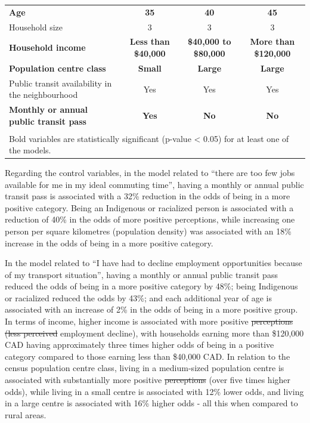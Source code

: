 \documentclass[preprint, 3p,
authoryear]{elsarticle} %
\providecommand{\DIFaddtex}[1]{{\protect\color{blue}\uwave{#1}}} %
\providecommand{\DIFdeltex}[1]{{\protect\color{red}\sout{#1}}}                      %
\providecommand{\DIFaddbegin}{} %
\providecommand{\DIFaddend}{} %
\providecommand{\DIFdelbegin}{} %
\providecommand{\DIFdelend}{} %
\providecommand{\DIFaddendFL}{} %
\providecommand{\DIFadd}[1]{\texorpdfstring{\DIFaddtex{#1}}{#1}} %
\providecommand{\DIFdel}[1]{\texorpdfstring{\DIFdeltex{#1}}{}} %
\newcommand{\DIFscaledelfig}{0.5}
\newlength{\DIFdelgraphicswidth} %
\newlength{\DIFdelgraphicsheight} %
\newcommand{\DIFaddincludegraphics}[2][]{{\color{blue}\fbox{\DIFOincludegraphics[#1]{#2}}}} %
\newcommand{\DIFdelincludegraphics}[2][]{%
\sbox{\DIFdelgraphicsbox}{\DIFOincludegraphics[#1]{#2}}%
\settoboxwidth{\DIFdelgraphicswidth}{\DIFdelgraphicsbox} %
\settoboxtotalheight{\DIFdelgraphicsheight}{\DIFdelgraphicsbox} %
\scalebox{\DIFscaledelfig}{%
\parbox[b]{\DIFdelgraphicswidth}{\usebox{\DIFdelgraphicsbox}\\[-\baselineskip] \rule{\DIFdelgraphicswidth}{0em}}\llap{\resizebox{\DIFdelgraphicswidth}{\DIFdelgraphicsheight}{%
\setlength{\unitlength}{\DIFdelgraphicswidth}%
\begin{picture}(1,1)%
\thicklines\linethickness{2pt} %
{\color[rgb]{1,0,0}\put(0,0){\framebox(1,1){}}}%
{\color[rgb]{1,0,0}\put(0,0){\line( 1,1){1}}}%
{\color[rgb]{1,0,0}\put(0,1){\line(1,-1){1}}}%
\end{picture}%
}\hspace*{3pt}}} %
} %
\DeclareRobustCommand{\DIFaddbegin}{\DIFOaddbegin \let\includegraphics\DIFaddincludegraphics} %
\DeclareRobustCommand{\DIFaddend}{\DIFOaddend \let\includegraphics\DIFOincludegraphics} %
\DeclareRobustCommand{\DIFdelbegin}{\DIFOdelbegin \let\includegraphics\DIFdelincludegraphics} %
\DeclareRobustCommand{\DIFdelend}{\DIFOaddend \let\includegraphics\DIFOincludegraphics} %
\DeclareRobustCommand{\DIFaddendFL}{\DIFOaddendFL \let\includegraphics\DIFOincludegraphics} %
\begin{document}
\begin{table}
{\begin{tabular}[t]{lccc}
\textbf{Age} & \textbf{35} & \textbf{40} & \textbf{45}\\
Household size & 3 & 3 & 3\\
\textbf{Household income} & \textbf{Less than \$40,000} & \textbf{\$40,000 to \$80,000} & \textbf{More than \$120,000}\\
\addlinespace
\textbf{Population centre class} & \textbf{Small} & \textbf{Large} & \textbf{Large}\\
Public transit availability in the neighbourhood & Yes & Yes & Yes\\
\textbf{Monthly or annual public transit pass} & \textbf{Yes} & \textbf{No} & \textbf{No}\\
\bottomrule
\multicolumn{4}{l}{\textsuperscript{} Bold variables are statistically significant (p-value < 0.05) for at least one of the models.}\\
\end{tabular}}
\DIFaddendFL \end{table}

Regarding the control variables, in the model related to ``there are too
few jobs available for me in my ideal commuting time'', having a monthly
or annual public transit pass is associated with a 32\% reduction in the
odds of being in a more positive category. Being an Indigenous or
racialized person is associated with a reduction of 40\% in the odds of
more positive perceptions, while increasing one person per square
kilometres (population density) was associated with an 18\% increase in
the odds of being in a more positive category.

In the model related to ``I have had to decline employment opportunities
because of my transport situation'', having a monthly or annual public
transit pass reduced the odds of being in a more positive category by
48\%; being Indigenous or racialized reduced the odds by 43\%; and each
additional year of age is associated with an increase of 2\% in the odds
of being in a more positive group. In terms of income, higher income is
associated with more positive \DIFdelbegin \DIFdel{perceptions (less perceived }\DIFdelend \DIFaddbegin \DIFadd{outcome (less }\DIFaddend employment decline), with
households earning more than \$120,000 CAD having approximately three
times higher odds of being in a positive category compared to those
earning less than \$40,000 CAD. In relation to the census population
centre class, living in a medium-sized population centre is associated
with substantially more positive \DIFdelbegin \DIFdel{perceptions }\DIFdelend \DIFaddbegin \DIFadd{outcomes }\DIFaddend (over five times higher odds),
while living in a small centre is associated with 12\% lower odds, and
living in a large centre is associated with 16\% higher odds - all this
when compared to rural areas.
\end{document}

